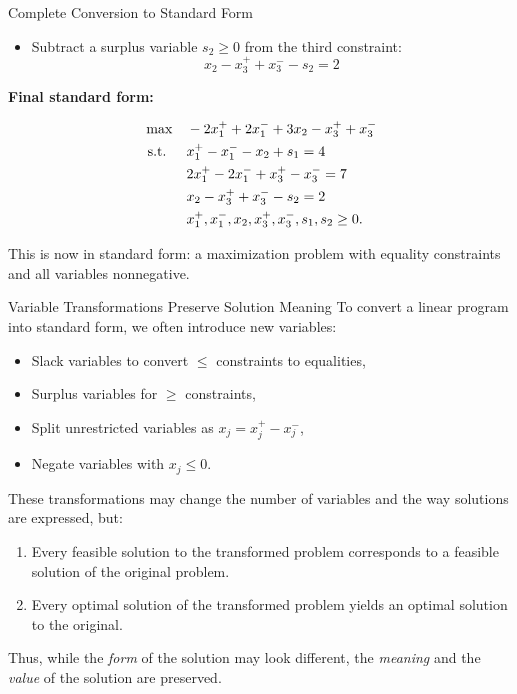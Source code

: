 \begin{example}{Complete Conversion to Standard Form}
\begin{itemize}
    \item Subtract a surplus variable \( s_2 \geq 0 \) from the third constraint:
    \[
    x_2 - x_3^+ + x_3^- - s_2 = 2
    \]
\end{itemize}

\medskip
\textbf{Final standard form:}

\[
\begin{aligned}
\max \quad & -2x_1^+ + 2x_1^- + 3x_2 - x_3^+ + x_3^- \\
\mbox{ s.t. } \quad 
& x_1^+ - x_1^- - x_2 + s_1 = 4 \\
& 2x_1^+ - 2x_1^- + x_3^+ - x_3^- = 7 \\
& x_2 - x_3^+ + x_3^- - s_2 = 2 \\
& x_1^+, x_1^-, x_2, x_3^+, x_3^-, s_1, s_2 \geq 0.
\end{aligned}
\]

This is now in standard form: a maximization problem with equality constraints and all variables nonnegative.
\end{example}

\begin{remark}{Variable Transformations Preserve Solution Meaning}{}
To convert a linear program into standard form, we often introduce new variables:
\begin{itemize}
    \item Slack variables to convert \( \leq \) constraints to equalities,
    \item Surplus variables for \( \geq \) constraints,
    \item Split unrestricted variables as \( x_j = x_j^+ - x_j^- \),
    \item Negate variables with \( x_j \leq 0 \).
\end{itemize}

These transformations may change the number of variables and the way solutions are expressed, but:
\begin{enumerate}
    \item Every feasible solution to the transformed problem corresponds to a feasible solution of the original problem.
    \item Every optimal solution of the transformed problem yields an optimal solution to the original.
\end{enumerate}

Thus, while the \emph{form} of the solution may look different, the \emph{meaning} and the \emph{value} of the solution are preserved.
\end{remark}

